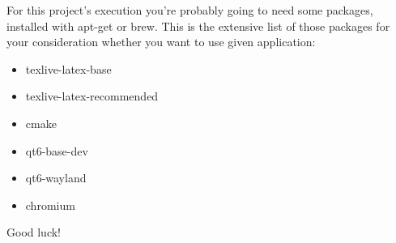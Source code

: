 \documentclass{article}
\begin{document}
For this project's execution you're probably going to need some packages, installed with apt-get or brew. This is the extensive list of those packages for your consideration whether you want to use given application:

\begin{itemize}
  \item {\color{CadetBlue} texlive-latex-base}
  \item {\color{CadetBlue} texlive-latex-recommended}
  \item {\color{CadetBlue} cmake}
  \item {\color{CadetBlue} qt6-base-dev}
  \item {\color{CadetBlue} qt6-wayland}
  \item {\color{CadetBlue} chromium}
\end{itemize}
Good luck!
\end{document}
